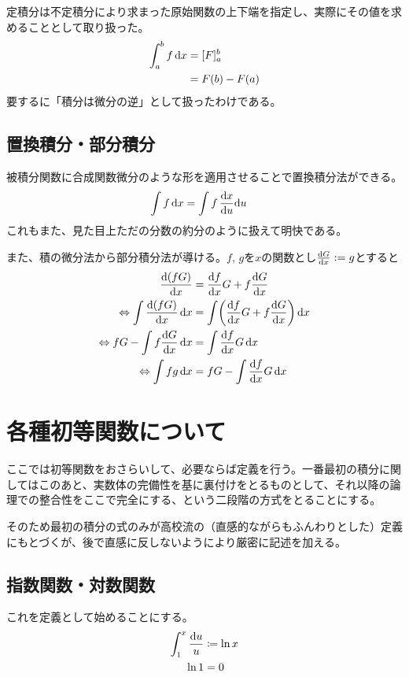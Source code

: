 定積分は不定積分により求まった原始関数の上下端を指定し、実際にその値を求めることとして取り扱った。
\begin{align}
    \begin{aligned}
        \int_a^b f\,\dx & =[F]_a^b             \\
                        & =F\pare{b}-F\pare{a}
    \end{aligned}\label{eq:1.6}
\end{align}
要するに「積分は微分の逆」として扱ったわけである。
\subsection{置換積分・部分積分}
被積分関数に合成関数微分のような形を適用させることで置換積分法ができる。
\begin{align}
    \int f\,\mathrm{d}x & =\int f\,\frac{\mathrm{d}x}{\mathrm{d}u}\mathrm{d}u \label{eq:1.7}
\end{align}
これもまた、見た目上ただの分数の約分のように扱えて明快である。

また、積の微分法から部分積分法が導ける。$f,\,g$を$x$の関数とし$\frac{\mathrm{d}G}{\mathrm{d}x}:=g$とすると
\begin{align}
    \begin{aligned}
        \diff{\pare{fG}}x                          & =\diff{f}xG+f\diff{G}x                 \\
        \Leftrightarrow \int\diff{\pare{fG}}x\,\dx & =\int\pare{\diff{f}xG+f\diff{G}x}\,\dx \\
        \Leftrightarrow fG-\int f\diff{G}x\,\dx    & =\int\diff{f}xG\,\dx                   \\
        \Leftrightarrow \int fg\,\dx               & =fG-\int\diff{f}xG\,\dx
    \end{aligned}\label{eq:1.8}
\end{align}
\clearpage
\section{各種初等関数について}
ここでは初等関数をおさらいして、必要ならば定義を行う。一番最初の積分に関してはこのあと、実数体の完備性を基に裏付けをとるものとして、それ以降の論理での整合性をここで完全にする、という二段階の方式をとることにする。

そのため最初の積分の式のみが高校流の（直感的ながらもふんわりとした）定義にもとづくが、後で直感に反しないようにより厳密に記述を加える。
\subsection{指数関数・対数関数}
これを定義として始めることにする。
\begin{align}
    \begin{aligned}
        \int_1^x \frac{\mathrm{d}u}u & \coloneqq\ln x \\
        \ln 1                & =0
    \end{aligned}\label{eq:1.9}
\end{align}


